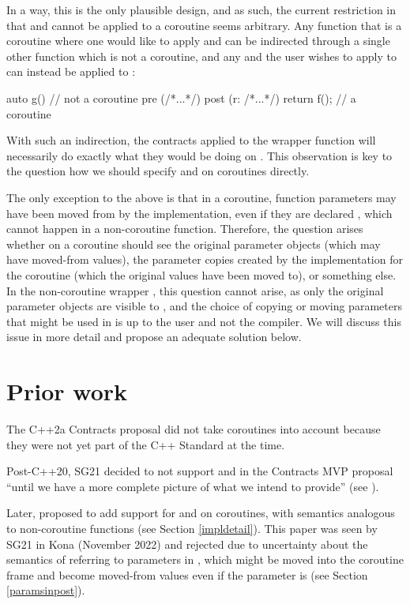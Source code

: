 In a way, this is the only plausible design, and as such, the current restriction in \cite{P2900R8} that  and  cannot be applied to a coroutine seems arbitrary. Any function  that is a coroutine where one would like to apply  and  can be indirected through a single other function  which is not a coroutine, and any  and  the user wishes to apply to  can instead be applied to :
\begin{codeblock}
auto g()  // not a coroutine
  pre (/*...*/) 
  post (r: /*...*/) 
{ 
  return f();  // a coroutine
} 
\end{codeblock}
With such an indirection, the contracts applied to the wrapper function  will necessarily do exactly what they would be doing on . This observation is key to the question how we should specify  and  on coroutines directly. 

The only exception to the above is that in a coroutine, function parameters may have been moved from by the implementation, even if they are declared , which cannot happen in a non-coroutine function. Therefore, the question arises whether  on a coroutine should see the original parameter objects (which may have moved-from values), the parameter copies created by the implementation for the coroutine (which the original values have been moved to), or something else. In the non-coroutine wrapper , this question cannot arise, as only the original parameter objects are visible to , and the choice of copying or moving parameters that might be used in  is up to the user and not the compiler. We will discuss this issue in more detail and propose an adequate solution below.

\section{Prior work}

The C++2a Contracts proposal \cite{P0542R5} did not take coroutines into account because they were not yet part of the C++ Standard at the time.

Post-C++20, SG21 decided to not support  and  in the Contracts MVP proposal ``until we have a more complete picture of what we intend to provide'' (see \cite{P2932R3}).

Later, \cite{P2957R0} proposed to add support for  and  on coroutines, with semantics analogous to non-coroutine functions (see Section \ref{impldetail}). This paper was seen by SG21 in Kona (November 2022) and rejected due to uncertainty about the semantics of referring to parameters in , which might be moved into the coroutine frame and become moved-from values even if the parameter is  (see Section \ref{paramsinpost}).

